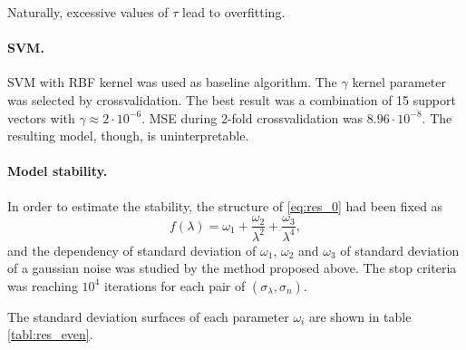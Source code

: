 \documentclass[11pt,a4paper]{article}
\theoremstyle{definition}
\begin{document}
Naturally, excessive values of $\tau$ lead to overfitting.

\paragraph{SVM.}

SVM with RBF kernel \cite{Vapnik79} was used as baseline algorithm. The $\gamma$ kernel
parameter was selected by crossvalidation. The best result was a combination of 15
support vectors with $\gamma \approx 2 \cdot 10^{-6}$. MSE during 2-fold crossvalidation
was $8.96 \cdot 10^{-8}$. The resulting model, though, is uninterpretable.

\paragraph{Model stability.}

In order to estimate the stability, the structure of \eqref{eq:res_0} had been fixed as
\[
  f(\lambda) = \omega_1 + \frac{\omega_2}{\lambda^2} + \frac{\omega_3}{\lambda^4},
\]
and the dependency of standard deviation of $\omega_1$, $\omega_2$ and $\omega_3$
of standard deviation of a gaussian noise was studied by the method proposed above.
The stop criteria was reaching $10^4$ iterations for each pair of $(\sigma_{\lambda}, \sigma_n)$.

The standard deviation surfaces of each parameter $\omega_i$ are shown in
table \ref{tabl:res_even}.
\end{document}
